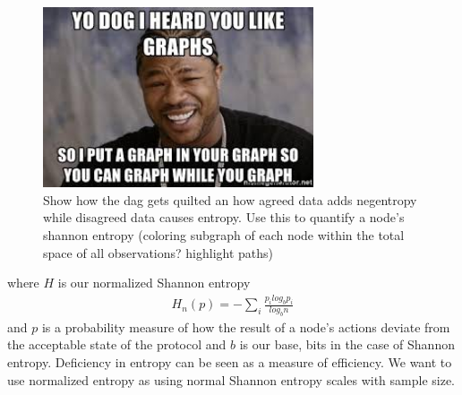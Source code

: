 \documentclass{article}
\begin{document}
\begin{figure}[h]
\caption{Show how the dag gets quilted an how agreed data adds negentropy while disagreed data causes entropy. Use this to quantify a node's shannon entropy (coloring subgraph of each node within the total space of all observations? highlight paths)}
\includegraphics[width=8cm]{yo_dawg}
\centering
\end{figure}

where $H$ is our normalized Shannon entropy
\begin{equation*} \label{eq1}
\begin{split}
H_n(p) = - \sum_i \frac{p_i log_b p_i}{log_b n}
\end{split}
\end{equation*}
and $p$ is a probability measure of how the result of a node's actions deviate from the acceptable state of the protocol and $b$ is our base, bits in the case of Shannon entropy. Deficiency in entropy can be seen as a measure of efficiency. We want to use normalized entropy as using normal Shannon entropy scales with sample size.




\end{document}
